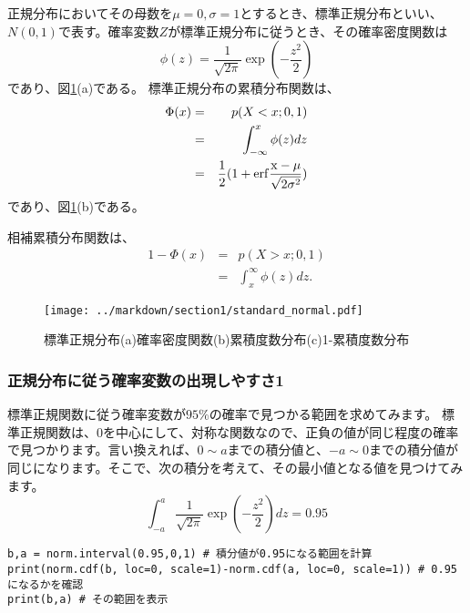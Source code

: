 \documentclass[a4paper,11pt,dvipdfmx]{jsarticle}
\begin{document}
正規分布においてその母数を$\mu=0,\sigma=1$とするとき、標準正規分布といい、$N(0,1)$で表す。確率変数$Z$が標準正規分布に従うとき、その確率密度関数は
\begin{equation}
\phi(z) = \frac{1}{\sqrt{2\pi}}\exp(-\frac{z^2}{2})
\end{equation}
であり、図\ref{fig:standard_normal_distribution}(a)である。
標準正規分布の累積分布関数は、
\begin{eqnarray}
\Phi(x) &=& p(X<x; 0,1) \\
    &=& \int_{-\infty}^x \phi(z)dz \\
    &=& \frac{1}{2}(1+\rm{erf}\frac{x-\mu}{\sqrt{2\sigma^2}})
\end{eqnarray}
であり、図\ref{fig:standard_normal_distribution}(b)である。

相補累積分布関数は、
\begin{eqnarray}
    1-\Phi(x) &=& p(X>x; 0,1) \\
        &=& \int_{x}^{\infty} \phi(z)dz.
\end{eqnarray}



\begin{figure}
    \begin{center}
        \texttt{[image: ../markdown/section1/standard\_normal.pdf]}
        \caption{標準正規分布(a)確率密度関数(b)累積度数分布(c)1-累積度数分布}
        \label{fig:standard_normal_distribution}

    \end{center}
\end{figure}
    

\subsubsection{正規分布に従う確率変数の出現しやすさ1}
標準正規関数に従う確率変数が$95\%$の確率で見つかる範囲を求めてみます。
標準正規関数は、0を中心にして、対称な関数なので、正負の値が同じ程度の確率で見つかります。言い換えれば、$0\sim a$までの積分値と、$-a\sim 0$までの積分値が同じになります。そこで、次の積分を考えて、その最小値となる値を見つけてみます。
\begin{equation}
\int_{-a}^{a} \frac{1}{\sqrt{2\pi}}\exp(-\frac{z^2}{2}) dz = 0.95
\end{equation}

\begin{lstlisting}
b,a = norm.interval(0.95,0,1) # 積分値が0.95になる範囲を計算
print(norm.cdf(b, loc=0, scale=1)-norm.cdf(a, loc=0, scale=1)) # 0.95になるかを確認
print(b,a) # その範囲を表示
\end{lstlisting}
\end{document}
